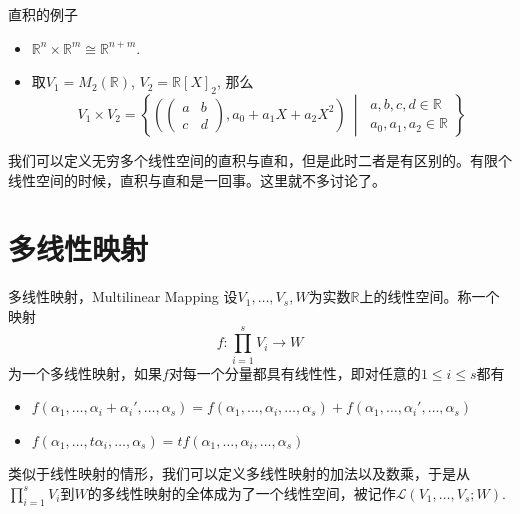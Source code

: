 \begin{frame}

\begin{block}{直积的例子}
\begin{itemize}
\item $\mathbb{R}^n \times \mathbb{R}^m \cong \mathbb{R}^{n+m}$.
\vspace{1em}
\item 取$V_1 = M_2(\mathbb{R})$, $V_2 = \mathbb{R}[X]_2$, 那么
\[V_1\times V_2 = \left\{ \left( \begin{pmatrix} a & b \\ c & d \end{pmatrix}, a_0 + a_1X + a_2X^2 \right) \ \middle|\ \substack{a,b,c,d\in\mathbb{R} \\ a_0,a_1,a_2\in\mathbb{R}} \right\}\]
\end{itemize}
\end{block}

\pause
\vspace{2em}

\begin{remark}
我们可以定义无穷多个线性空间的直积与直和，但是此时二者是有区别的。有限个线性空间的时候，直积与直和是一回事。这里就不多讨论了。
\end{remark}

\end{frame}


\section{多线性映射}


\begin{frame}

\begin{block}{多线性映射，Multilinear Mapping}
设$V_1,\ldots,V_s,W$为实数$\mathbb{R}$上的线性空间。称一个映射
\[f: \prod_{i=1}^s V_i \rightarrow W\]
为一个多线性映射，如果$f$对每一个分量都具有线性性，即对任意的$1\leqslant i \leqslant s$都有
\begin{itemize}
\item $f(\alpha_1,\ldots,\alpha_i+\alpha_i',\ldots,\alpha_s) = f(\alpha_1,\ldots,\alpha_i,\ldots,\alpha_s) + f(\alpha_1,\ldots,\alpha_i',\ldots,\alpha_s)$
\item $f(\alpha_1,\ldots,t\alpha_i,\ldots,\alpha_s) = tf(\alpha_1,\ldots,\alpha_i,\ldots,\alpha_s)$
\end{itemize}

\pause

类似于线性映射的情形，我们可以定义多线性映射的加法以及数乘，于是从$\prod\limits_{i=1}^s V_i$到$W$的多线性映射的全体成为了一个线性空间，被记作$\mathcal{L}(V_1,\ldots,V_s;W)$.
\end{block}

\end{frame}

